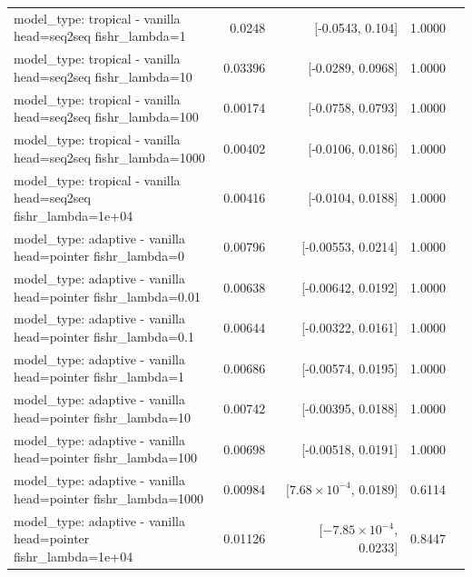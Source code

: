 \documentclass[10pt]{article}
\makeatletter
\newcommand{\stackcell}[1]{\begin{tabular}[t]{@{}l@{}}#1\end{tabular}}
\makeatother
\begin{document}
{\begin{longtable}{lrrrl}
\stackcell{model\_type: tropical - vanilla\\\footnotesize head=seq2seq fishr\_lambda=1 } & 0.0248 & [-0.0543, 0.104] & 1.0000 & \\
\stackcell{model\_type: tropical - vanilla\\\footnotesize head=seq2seq fishr\_lambda=10 } & 0.03396 & [-0.0289, 0.0968] & 1.0000 & \\
\stackcell{model\_type: tropical - vanilla\\\footnotesize head=seq2seq fishr\_lambda=100 } & 0.00174 & [-0.0758, 0.0793] & 1.0000 & \\
\stackcell{model\_type: tropical - vanilla\\\footnotesize head=seq2seq fishr\_lambda=1000 } & 0.00402 & [-0.0106, 0.0186] & 1.0000 & \\
\stackcell{model\_type: tropical - vanilla\\\footnotesize head=seq2seq fishr\_lambda=1e+04 } & 0.00416 & [-0.0104, 0.0188] & 1.0000 & \\
\stackcell{model\_type: adaptive - vanilla\\\footnotesize head=pointer fishr\_lambda=0 } & 0.00796 & [-0.00553, 0.0214] & 1.0000 & \\
\stackcell{model\_type: adaptive - vanilla\\\footnotesize head=pointer fishr\_lambda=0.01 } & 0.00638 & [-0.00642, 0.0192] & 1.0000 & \\
\stackcell{model\_type: adaptive - vanilla\\\footnotesize head=pointer fishr\_lambda=0.1 } & 0.00644 & [-0.00322, 0.0161] & 1.0000 & \\
\stackcell{model\_type: adaptive - vanilla\\\footnotesize head=pointer fishr\_lambda=1 } & 0.00686 & [-0.00574, 0.0195] & 1.0000 & \\
\stackcell{model\_type: adaptive - vanilla\\\footnotesize head=pointer fishr\_lambda=10 } & 0.00742 & [-0.00395, 0.0188] & 1.0000 & \\
\stackcell{model\_type: adaptive - vanilla\\\footnotesize head=pointer fishr\_lambda=100 } & 0.00698 & [-0.00518, 0.0191] & 1.0000 & \\
\stackcell{model\_type: adaptive - vanilla\\\footnotesize head=pointer fishr\_lambda=1000 } & 0.00984 & [$7.68\times10^{-4}$, 0.0189] & 0.6114 & \\
\stackcell{model\_type: adaptive - vanilla\\\footnotesize head=pointer fishr\_lambda=1e+04 } & 0.01126 & [$-7.85\times10^{-4}$, 0.0233] & 0.8447 & \\

\end{longtable}}
\end{document}
